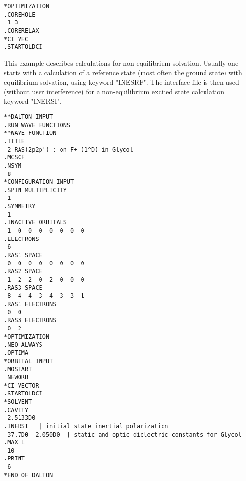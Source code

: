 \begin{verbatim}
*OPTIMIZATION
.COREHOLE
 1 3
.CORERELAX
*CI VEC
.STARTOLDCI
\end{verbatim}
\label{sirius_ex7}

\begin{center}
\end{center}

This example describes calculations for non-equilibrium
solvation.
Usually one starts with a calculation of a reference state
(most often the ground state) with equilibrium solvation, using
keyword "INESRF". The interface file is then used (without user 
interference) for a non-equilibrium excited state calculation; keyword
"INERSI". 

\begin{verbatim}
**DALTON INPUT
.RUN WAVE FUNCTIONS
**WAVE FUNCTION
.TITLE
 2-RAS(2p2p') : on F+ (1^D) in Glycol 
.MCSCF
.NSYM
 8
*CONFIGURATION INPUT
.SPIN MULTIPLICITY
 1
.SYMMETRY
 1
.INACTIVE ORBITALS
 1  0  0  0  0  0  0  0 
.ELECTRONS
 6
.RAS1 SPACE
 0  0  0  0  0  0  0  0
.RAS2 SPACE
 1  2  2  0  2  0  0  0
.RAS3 SPACE
 8  4  4  3  4  3  3  1
.RAS1 ELECTRONS 
 0  0 
.RAS3 ELECTRONS 
 0  2 
*OPTIMIZATION
.NEO ALWAYS
.OPTIMA
*ORBITAL INPUT
.MOSTART
 NEWORB
*CI VECTOR
.STARTOLDCI
*SOLVENT
.CAVITY
 2.5133D0
.INERSI   | initial state inertial polarization
 37.7D0  2.050D0  | static and optic dielectric constants for Glycol
.MAX L
 10
.PRINT
 6
*END OF DALTON
\end{verbatim}
\label{sirius_ex8}
 
